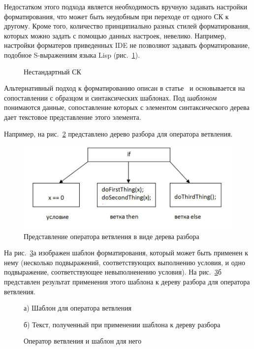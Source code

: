 \documentclass[conference]{IEEEtran}
\begin{document}
Недостатком этого подхода является необходимость вручную задавать настройки форматирования, что может быть неудобным при переходе от одного СК к другому.
Кроме того, количество принципиально разных стилей форматирования, которых можно задать с помощью данных настроек, невелико.
Например, настройки форматеров приведенных IDE не позволяют задавать форматирование, подобное S-выражениям языка Lisp (рис.~\ref{fig:unusualCC}).
\begin{figure}[h]
	\centering
	
	\caption{Нестандартный СК}
	\label{fig:unusualCC}
\end{figure}

Альтернативный подход к форматированию описан в статье~\cite{while} и основывается на сопоставлении с образцом и синтаксических шаблонах.
Под \emph{шаблоном} понимаются данные, сопоставление которых с элементом синтаксического дерева дает текстовое представление этого элемента.

Например, на рис.~\ref{fig:ifTree} представлено дерево разбора для оператора ветвления. 
\begin{figure}[h]
	\centering
	\includegraphics[width=.5\textwidth]{images/ifTree.jpg}
	\caption{Представление оператора ветвления в виде дерева разбора}
	\label{fig:ifTree}
\end{figure}

На рис.~\ref{fig:tmpltcodeintro}а изображен шаблон форматирования, который может быть применен к нему (несколько подвыражений, соответствующих выполнению условия, и одно подвыражение, соответствующее невыполненению условия).
На рис.~\ref{fig:tmpltcodeintro}б представлен результат применения этого шаблона к дереву разбора для оператора ветвления.

\begin{figure}[ht]
\noindent\begin{minipage}{.2\textwidth}
    
\caption*{а) Шаблон для оператора ветвления}    
\end{minipage}\hfill
\begin{minipage}{.25\textwidth}
    
\caption*{б) Текст, полученный при применении шаблона к дереву разбора}    
\end{minipage}
\caption{Оператор ветвления и шаблон для него}    
\label{fig:tmpltcodeintro}
\end{figure}
\end{document}
